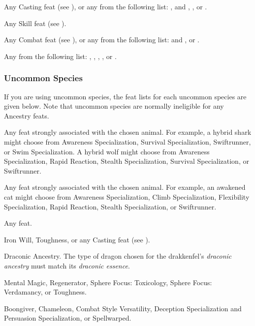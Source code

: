      Any Casting feat (see ), or any from the following list: ,  and , , or .

     Any Skill feat (see ).

     Any Combat feat (see ), or any from the following list:  and , or .

     Any from the following list: , , , , or .

    \subsubsection{Uncommon Species}
      If you are using uncommon species, the feat lists for each uncommon species are given below.
      Note that uncommon species are normally ineligible for any Ancestry feats.

       Any feat strongly associated with the chosen animal. For example, a hybrid shark might choose from Awareness Specialization, Survival Specialization, Swiftrunner, or Swim Specialization. A hybrid wolf might choose from Awareness Specialization, Rapid Reaction, Stealth Specialization, Survival Specialization, or Swiftrunner.

       Any feat strongly associated with the chosen animal. For example, an awakened cat might choose from Awareness Specialization, Climb Specialization, Flexibility Specialization, Rapid Reaction, Stealth Specialization, or Swiftrunner.

       Any feat.

       Iron Will, Toughness, or any Casting feat (see ).

       Draconic Ancestry. The type of dragon chosen for the drakkenfel's \textit{draconic ancestry} must match its \textit{draconic essence}.

       Mental Magic, Regenerator, Sphere Focus: Toxicology, Sphere Focus: Verdamancy, or Toughness.

       Boongiver, Chameleon, Combat Style Versatility, Deception Specialization and Persuasion Specialization, or Spellwarped.

